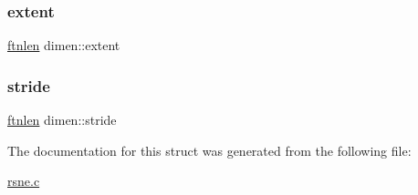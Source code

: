 \mbox{\label{structdimen_a42c8fb8a365b619472e0d5b84a06955d}} 
\subsubsection{\texorpdfstring{extent}{extent}}
{\footnotesize\ttfamily \hyperlink{dependencies_2third-party_2clapack_23_82_81_2_f2_c_l_i_b_s_2libf2c_2f2c_8h_a2ad57b5f7f73e0131623aa6dbff6d3f3}{ftnlen} dimen\+::extent}

\mbox{\label{structdimen_aeef14482d8233afaf9f3a0f54e220357}} 
\subsubsection{\texorpdfstring{stride}{stride}}
{\footnotesize\ttfamily \hyperlink{dependencies_2third-party_2clapack_23_82_81_2_f2_c_l_i_b_s_2libf2c_2f2c_8h_a2ad57b5f7f73e0131623aa6dbff6d3f3}{ftnlen} dimen\+::stride}



The documentation for this struct was generated from the following file\+:\begin{DoxyCompactItemize}
\item 
\hyperlink{rsne_8c}{rsne.\+c}\end{DoxyCompactItemize}
